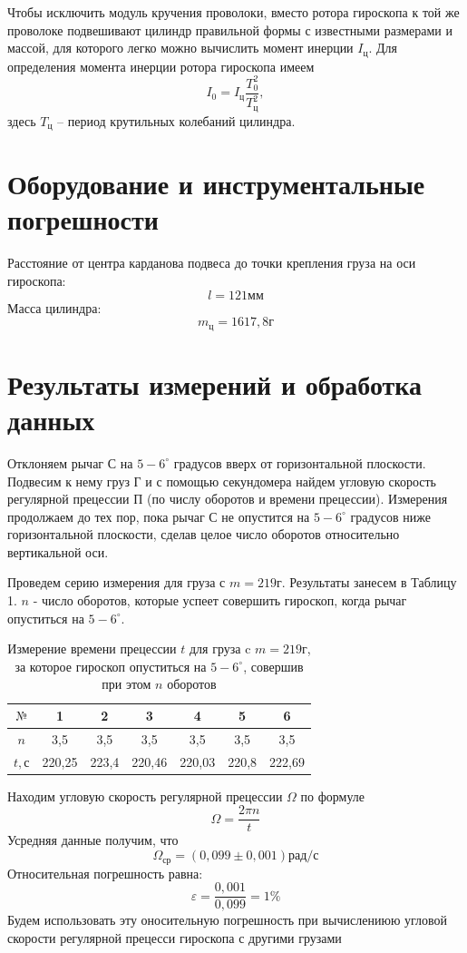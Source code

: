 \documentclass[a4paper,12pt]{article} %
\begin{document}
Чтобы исключить модуль кручения проволоки, вместо ротора гироскопа к той же проволоке подвешивают цилиндр правильной формы с известными размерами и массой, для которого легко можно вычислить момент инерции $I_\text{ц}$. Для определения момента инерции ротора гироскопа имеем
\begin{equation}
I_0 = I_\text{ц}\frac{T_0^2}{T_{\text{ц}}^2},
\end{equation}
здесь $T_\text{ц}$ -- период крутильных колебаний цилиндра.
\section{Оборудование и инструментальные погрешности}
Расстояние от центра карданова подвеса до точки крепления груза на оси гироскопа:
\[l = 121\text{мм}\]
Масса цилиндра:
\[m_\text{ц} = 1617,8\text{г}\]
\section{Результаты измерений и обработка данных}
Отклоняем рычаг $\text{С}$ на $5-6^{\circ}$ градусов вверх от горизонтальной плоскости. Подвесим к нему груз $\text{Г}$ и с помощью секундомера найдем угловую скорость регулярной прецессии $\text{П}$ (по числу оборотов и времени прецессии). Измерения продолжаем до тех пор, пока рычаг $\text{С}$ не опустится на $5-6^{\circ}$ градусов ниже горизонтальной плоскости, сделав целое число оборотов относительно вертикальной оси.

Проведем серию измерения для груза с $m = 219\text{г}$. Результаты занесем в Таблицу 1. $n$ - число оборотов, которые успеет совершить гироскоп, когда рычаг опуститься на $5-6^{\circ}$.
\begin{table}[h]
\centering
\begin{tabular}{|c|c|c|c|c|c|c|}
\hline
$\text{№}$ & 1      & 2     & 3      & 4      & 5     & 6      \\ \hline
$n$      & 3,5    & 3,5   & 3,5    & 3,5    & 3,5   & 3,5    \\ \hline
$t, \text{с}$      & 220,25 & 223,4 & 220,46 & 220,03 & 220,8 & 222,69 \\ \hline
\end{tabular}
\caption{Измерение времени прецессии $t$ для груза c $m = 219\text{г}$, за которое гироскоп опуститься на $5-6^{\circ}$, совершив при этом $n$ оборотов}
\end{table}

Находим угловую скорость регулярной прецессии $\Omega$ по формуле 
\[\Omega = \frac{2\pi n}{t}\]
Усредняя данные получим, что 
\[\Omega_\text{ср} = (0,099\pm0,001)\text{рад/с}\]
Относительная погрешность равна:
\[\varepsilon = \frac{0,001}{0,099} = 1\%\]
Будем использовать эту оносительную погрешность при вычислениюю угловой скорости регулярной прецесси гироскопа с другими грузами
\end{document}
